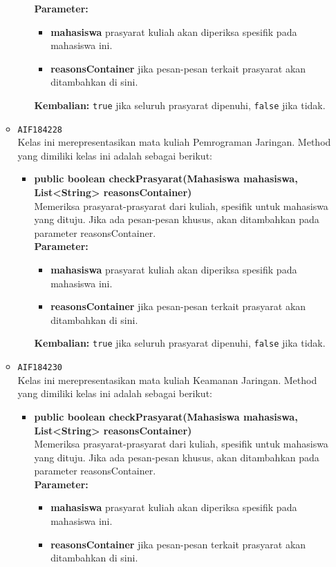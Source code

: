 \begin{enumerate}
\begin{itemize}
\begin{itemize}
\textbf{Parameter:}
\begin{itemize}
\item \textbf{mahasiswa} prasyarat kuliah akan diperiksa spesifik pada mahasiswa ini.
\item \textbf{reasonsContainer} jika pesan-pesan terkait prasyarat akan ditambahkan di sini.
\end{itemize}
\textbf{Kembalian:} \texttt{true} jika seluruh prasyarat dipenuhi, \texttt{false} jika tidak.
\end{itemize}
\item \texttt{AIF184228} \\
Kelas ini merepresentasikan mata kuliah Pemrograman Jaringan. Method yang dimiliki kelas ini adalah sebagai berikut: 
\begin{itemize}
\item \textbf{public boolean checkPrasyarat(Mahasiswa mahasiswa, List<String> reasonsContainer)}\\
Memeriksa prasyarat-prasyarat dari kuliah, spesifik untuk mahasiswa yang dituju. Jika ada pesan-pesan khusus, akan ditambahkan pada parameter reasonsContainer.\\
\textbf{Parameter:}
\begin{itemize}
\item \textbf{mahasiswa} prasyarat kuliah akan diperiksa spesifik pada mahasiswa ini.
\item \textbf{reasonsContainer} jika pesan-pesan terkait prasyarat akan ditambahkan di sini.
\end{itemize}
\textbf{Kembalian:} \texttt{true} jika seluruh prasyarat dipenuhi, \texttt{false} jika tidak.
\end{itemize}
\item \texttt{AIF184230} \\
Kelas ini merepresentasikan mata kuliah Keamanan Jaringan. Method yang dimiliki kelas ini adalah sebagai berikut: 
\begin{itemize}
\item \textbf{public boolean checkPrasyarat(Mahasiswa mahasiswa, List<String> reasonsContainer)}\\
Memeriksa prasyarat-prasyarat dari kuliah, spesifik untuk mahasiswa yang dituju. Jika ada pesan-pesan khusus, akan ditambahkan pada parameter reasonsContainer.\\
\textbf{Parameter:}
\begin{itemize}
\item \textbf{mahasiswa} prasyarat kuliah akan diperiksa spesifik pada mahasiswa ini.
\item \textbf{reasonsContainer} jika pesan-pesan terkait prasyarat akan ditambahkan di sini.

\end{itemize}
\end{itemize}
\end{itemize}
\end{enumerate}
